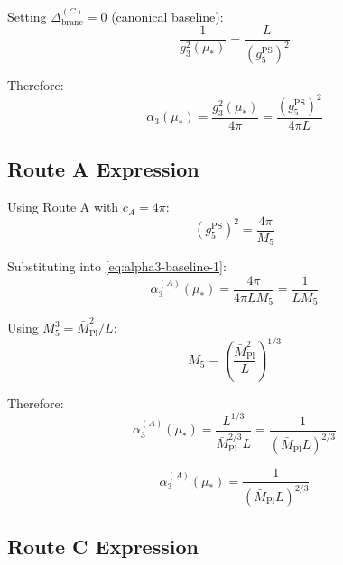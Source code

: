 \documentclass[11pt,a4paper]{article}
\theoremstyle{definition}
\begin{document}
Setting $\Delta_{\text{brane}}^{(C)} = 0$ (canonical baseline):
\begin{equation}
\label{eq:baseline-start}
\frac{1}{g_3^2(\mu_*)} = \frac{L}{(g_5^{\text{PS}})^2}
\end{equation}

Therefore:
\begin{equation}
\label{eq:alpha3-baseline-1}
\alpha_3(\mu_*) = \frac{g_3^2(\mu_*)}{4\pi} = \frac{(g_5^{\text{PS}})^2}{4\pi L}
\end{equation}

\subsection{Route A Expression}
\label{subsec:route-a-expression}

Using Route A with $c_A = 4\pi$:
\begin{equation}
\label{eq:route-a-g5}
(g_5^{\text{PS}})^2 = \frac{4\pi}{M_5}
\end{equation}

Substituting into \eqref{eq:alpha3-baseline-1}:
\begin{equation}
\label{eq:alpha3-route-a}
\alpha_3^{(A)}(\mu_*) = \frac{4\pi}{4\pi L M_5} = \frac{1}{L M_5}
\end{equation}

Using $M_5^3 = \bar{M}_{\text{Pl}}^2/L$:
\begin{equation}
\label{eq:m5-explicit}
M_5 = \left(\frac{\bar{M}_{\text{Pl}}^2}{L}\right)^{1/3}
\end{equation}

Therefore:
\begin{equation}
\label{eq:alpha3-route-a-explicit}
\alpha_3^{(A)}(\mu_*) = \frac{L^{1/3}}{\bar{M}_{\text{Pl}}^{2/3} L} = \frac{1}{(\bar{M}_{\text{Pl}} L)^{2/3}}
\end{equation}

\begin{closurebox}
\begin{equation}
\label{eq:alpha3-route-a-final}
\boxed{\alpha_3^{(A)}(\mu_*) = \frac{1}{(\bar{M}_{\text{Pl}} L)^{2/3}}}
\end{equation}
\end{closurebox}

\subsection{Route C Expression}
\label{subsec:route-c-expression}
\end{document}

